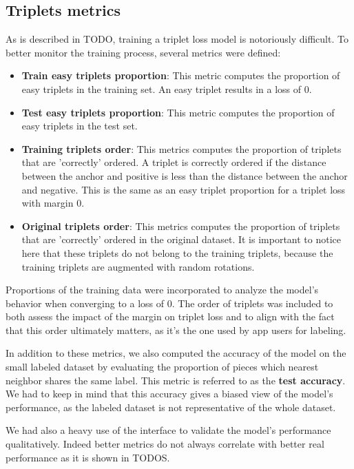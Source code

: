 \subsection{Triplets metrics} 
\label{sec:triplet-metrics}

As is described in TODO, training a triplet loss model is notoriously difficult. To better monitor the training process, several metrics were defined:
\begin{itemize}
    \item \textbf{Train easy triplets proportion}: This metric computes the proportion of easy triplets in the training set. An easy triplet results in a loss of 0.
    \item \textbf{Test easy triplets proportion}: This metric computes the proportion of easy triplets in the test set. 
    \item \textbf{Training triplets order}: This metrics computes the proportion of triplets that are 'correctly' ordered. A triplet is correctly ordered if the distance between the anchor and positive is less than the distance between the anchor and negative. This is the same as an easy triplet proportion for a triplet loss with margin 0.
    \item \textbf{Original triplets order}: This metrics computes the proportion of triplets that are 'correctly' ordered in the original dataset. It is important to notice here that these triplets do not belong to the training triplets, because the training triplets are augmented with random rotations.
\end{itemize}

Proportions of the training data were incorporated to analyze the model's behavior when converging to a loss of 0. The order of triplets was included to both assess the impact of the margin on triplet loss and to align with the fact that this order ultimately matters, as it's the one used by app users for labeling.

In addition to these metrics, we also computed the accuracy of the model on the small labeled dataset by evaluating the proportion of pieces which nearest neighbor shares the same label. This metric is referred to as the \textbf{test accuracy}. We had to keep in mind that this accuracy gives a biased view of the model's performance, as the labeled dataset is not representative of the whole dataset.

We had also a heavy use of the interface to validate the model's performance qualitatively. Indeed better metrics do not always correlate with better real performance as it is shown in TODOS.

